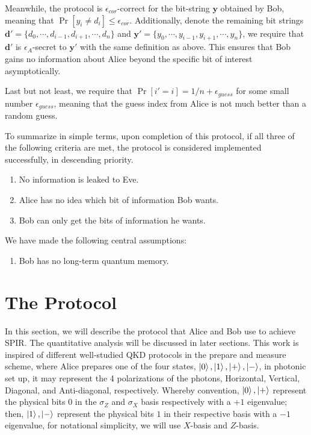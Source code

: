 \documentclass[%
 reprint,
superscriptaddress,
 amsmath,amssymb,
 aps,
]{revtex4-2}
\begin{document}
Meanwhile, the protocol is $\epsilon_{cor}$-correct for the bit-string $\mathbf{y}$ obtained by Bob, meaning that \(\Pr[y_i \ne d_i] \le \epsilon_{cor} \). Additionally, denote the remaining bit strings \( \mathbf{d'} = \{d_0, \cdots, d_{i-1}, d_{i+1}, \cdots, d_n\} \) and \( \mathbf{y'} = \{y_0, \cdots, y_{i-1}, y_{i+1}, \cdots, y_n\} \), we require that $\mathbf{d'}$ is $\epsilon_{A}$-secret to $\mathbf{y'}$ with the same definition as above. This ensures that Bob gains no information about Alice beyond the specific bit of interest asymptotically.

Last but not least, we require that $\Pr[i'=i]=1/n+\epsilon_{guess}$ for some small number $\epsilon_{guess}$, meaning that the guess index from Alice is not much better than a random guess.

To summarize in simple terms, upon completion of this protocol, if all three of the following criteria are met, the protocol is considered implemented successfully, in descending priority.
\begin{enumerate}
    \item No information is leaked to Eve.

    \item Alice has no idea which bit of information Bob wants.

    \item Bob can only get the bits of information he wants.
\end{enumerate}

We have made the following central assumptions:
\begin{enumerate}
    \item Bob has no long-term quantum memory.  
\end{enumerate}

\section{The Protocol}
\label{sec:the_protocol}
In this section, we will describe the protocol that Alice and Bob use to achieve SPIR. The quantitative analysis will be discussed in later sections. This work is inspired of different well-studied QKD protocols in the prepare and measure scheme, where Alice prepares one of the four states, $\ket{0}, \ket{1}, \ket{+}, \ket{-}$, in photonic set up, it may represent the 4 polarizations of the photons, Horizontal, Vertical, Diagonal, and Anti-diagonal, respectively. Whereby convention, $\ket{0}, \ket{+}$ represent the physical bits $0$ in the $\sigma_Z$ and $\sigma_X$ basis respectively with a $+1$ eigenvalue; then, $\ket{1}, \ket{-}$ represent the physical bits $1$ in their respective basis with a $-1$ eigenvalue, for notational simplicity, we will use $X$-basis and $Z$-basis.
\end{document}
